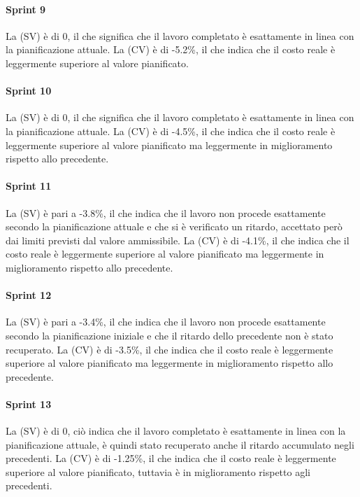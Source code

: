 \paragraph{Sprint 9}
La  (SV) è di 0, il che significa che il lavoro completato è esattamente in linea con la pianificazione attuale.
La  (CV) è di -5.2\%, il che indica che il costo reale è leggermente superiore al valore pianificato.

\paragraph{Sprint 10}
La  (SV) è di 0, il che significa che il lavoro completato è esattamente in linea con la pianificazione attuale.
La  (CV) è di -4.5\%, il che indica che il costo reale è leggermente superiore al valore pianificato ma leggermente in miglioramento rispetto allo  precedente.

\paragraph{Sprint 11}
La  (SV) è pari a -3.8\%, il che indica che il lavoro non procede esattamente secondo la pianificazione attuale e che si è verificato un ritardo, accettato però dai limiti previsti dal valore ammissibile.
La  (CV) è di -4.1\%, il che indica che il costo reale è leggermente superiore al valore pianificato ma leggermente in miglioramento rispetto allo  precedente.

\paragraph{Sprint 12}
La  (SV) è pari a -3.4\%, il che indica che il lavoro non procede esattamente secondo la pianificazione iniziale e che il ritardo dello  precedente non è stato recuperato.
La  (CV) è di -3.5\%, il che indica che il costo reale è leggermente superiore al valore pianificato ma leggermente in miglioramento rispetto allo  precedente.

\paragraph{Sprint 13}
La  (SV) è di 0, ciò indica che il lavoro completato è esattamente in linea con la pianificazione attuale, è quindi stato recuperato anche il ritardo accumulato negli  precedenti.
La  (CV) è di -1.25\%, il che indica che il costo reale è leggermente superiore al valore pianificato, tuttavia è in miglioramento rispetto agli  precedenti.

